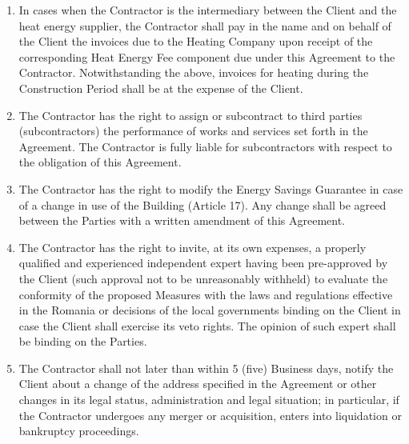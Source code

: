 \begin{multicols}{2}
\begin{enumerate}
	\item In cases when the Contractor is the intermediary between the Client and the heat energy supplier, the Contractor shall pay in the name and on behalf of the Client the invoices due to the Heating Company upon receipt of the corresponding Heat Energy Fee component due under this Agreement to the Contractor. Notwithstanding the above, invoices for heating during the Construction Period shall be at the expense of the Client.
	\item The Contractor has the right to assign or subcontract to third parties (subcontractors) the performance of works and services set forth in the Agreement. The Contractor is fully liable for subcontractors with respect to the obligation of this Agreement.
	\item The Contractor has the right to modify the Energy Savings Guarantee in case of a change in use of the Building (Article 17). Any change shall be agreed between the Parties with a written amendment of this Agreement.
	\item The Contractor has the right to invite, at its own expenses, a properly qualified and experienced independent expert having been pre-approved by the Client (such approval not to be unreasonably withheld) to evaluate the conformity of the proposed Measures with the laws and regulations effective in the Romania or decisions of the local governments binding on the Client in case the Client shall exercise its veto rights. The opinion of such expert shall be binding on the Parties.
	\item The Contractor shall not later than within 5 (five) Business days, notify the Client about a change of the address specified in the Agreement or other changes in its legal status, administration and legal situation; in particular, if the Contractor undergoes any merger or acquisition, enters into liquidation or bankruptcy proceedings.
\end{enumerate}


\end{multicols}
